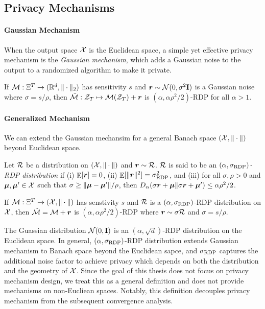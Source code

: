 \subsection{Privacy Mechanisms}

\paragraph{Gaussian Mechanism}
When the output space ${\cal X}$ is the Euclidean space, a simple yet effective privacy mechanism is the \emph{Gaussian mechanism}, which adds a Gaussian noise to the output to a randomized algorithm to make it private.

\begin{theorem}
If ${\cal M}:\Xi^T\to (\mathbb R^d,\|\cdot\|_2)$ has sensitivity $s$ and ${\boldsymbol{r}}\sim {\cal N}(0, \sigma^2{\mathbf{I}})$ is a Gaussian noise where $\sigma = s/\rho$, then $\tilde{{\cal M}}: {\cal Z}_T \mapsto {\cal M}({\cal Z}_T) + {\boldsymbol{r}}$ is $(\alpha,\alpha\rho^2/2)$-RDP for all $\alpha>1$.
\label{thm:DP-OTB:guassian-mechanism}
\end{theorem}

\paragraph{Generalized Mechanism}
We can extend the Gaussian mechansim for a general Banach space $({\cal X},\|\cdot\|)$ beyond Euclidean space. 

\begin{definition}
Let ${\cal R}$ be a distribution on $({\cal X},\|\cdot\|)$ and ${\boldsymbol{r}}\sim{\cal R}$. ${\cal R}$ is said to be an \emph{$(\alpha,\sigma_{\mathrm{RDP}})$-RDP distribution} if (i) $\mathop{\mathbb{E}}[{\boldsymbol{r}}]=0$, (ii) $\mathop{\mathbb{E}}[\|{\boldsymbol{r}}\|^2]=\sigma_{\mathrm{RDP}}^2$, and (iii) for all $\sigma, \rho>0$ and ${\boldsymbol{\mu}},{\boldsymbol{\mu}}'\in{\cal X}$ such that $\sigma\ge \|{\boldsymbol{\mu}}-{\boldsymbol{\mu}}'\|/\rho$, then $D_\alpha(\sigma {\boldsymbol{r}}+{\boldsymbol{\mu}} \| \sigma {\boldsymbol{r}}+{\boldsymbol{\mu}}')\le \alpha\rho^2/2$.
\label{def:DP-OTB:RDP-dist}
\end{definition}

\begin{theorem}
If ${\cal M}:\Xi^T\to({\cal X},\|\cdot\|)$ has senstivity $s$ and ${\cal R}$ is a $(\alpha,\sigma_{\mathrm{RDP}})$-RDP distribution on ${\cal X}$, then $\tilde{{\cal M}} = {\cal M} + {\boldsymbol{r}}$ is $(\alpha, \alpha\rho^2/2)$-RDP where ${\boldsymbol{r}}\sim \sigma{\cal R}$ and $\sigma = s/\rho$.
\label{thm:DP-OTB:RDP-mechanism}
\end{theorem}

The Guassian distribution ${\cal N}(0,{\mathbf{I}})$ is an $(\alpha,\sqrt{d})$-RDP distribution on the Euclidean space. 
In general, $(\alpha, \sigma_{\mathrm{RDP}})$-RDP distribution extends Gaussian mechanism to Banach space beyond the Euclidean sapce, and $\sigma_{\mathrm{RDP}}$ captures the additional noise factor to achieve privacy which depends on both the distribution and the geometry of ${\cal X}$. Since the goal of this thesis does not focus on privacy mechanism design, we treat this as a general definition and does not provide mechanisms on non-Eucliean spaces. Notably, this definition decouples privacy mechanism from the subsequent convergence analysis.

